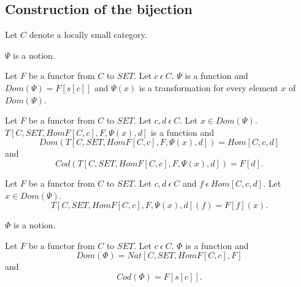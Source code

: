 \documentclass{article}
\newcommand{\inn}{~\epsilon~}
\newcommand{\innn}{~\epsilon~} %
\begin{document}
	\subsection{Construction of the bijection}
	\begin{forthel}
		
		Let $C$ denote a locally small category.
	
		\begin{signature}
			$\Psi$ is a notion.
		\end{signature}
		
		\begin{axiom}
			Let $F$ be a functor from $C$ to $SET$. Let $c \innn C$. $\Psi$ is a function and
			$Dom(\Psi) = F[s[c]]$ and $\Psi(x)$ is a transformation for every element $x$ of $Dom(\Psi)$.
		\end{axiom}
		
		\begin{axiom} 
			Let $F$ be a functor from $C$ to $SET$. 
			Let $c,d \innn C$.
			Let $x \in Dom(\Psi)$. 
			$T[C,SET,HomF[C,c],F,\Psi(x),d]$ is a function and
			$$Dom(T[C,SET,HomF[C,c],F,\Psi(x),d]) = Hom[C,c,d]$$ and 
			$$Cod(T[C,SET,HomF[C,c],F,\Psi(x),d]) = F[d].$$
		\end{axiom}
		
		\begin{axiom}[PsiDef]
			Let $F$ be a functor from $C$ to $SET$. 
			Let $c,d \innn C$ and $f\innn Hom[C,c,d].$
			Let $x \in Dom(\Psi)$. $$T[C,SET,HomF[C,c],F,\Psi(x),d](f) = F[f](x).$$
		\end{axiom}
		



		\begin{signature} $\Phi$ is a notion.
		\end{signature}
		
		\begin{axiom}
		Let $F$ be a functor from $C$ to $SET$. Let $c \innn C$. $\Phi$ is a function and
		$$Dom(\Phi) = Nat[C,SET,HomF[C,c],F]$$ and $$Cod(\Phi) = F[s[c]].$$
		\end{axiom}


\end{forthel}
\end{document}
